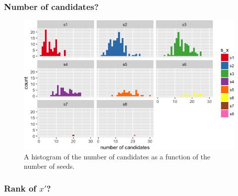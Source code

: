 \documentclass[]{article}
\begin{document}
\subsubsection{Number of candidates?}\label{number-of-candidates-2}

\begin{figure}
\centering
\includegraphics{vn_files/figure-latex/ccand2-1.png}
\caption{A histogram of the number of candidates as a function of the
number of seeds.}
\end{figure}

\subsubsection{\texorpdfstring{Rank of
\(x'\)?}{Rank of x'?}}\label{rank-of-x-2}
\end{document}
